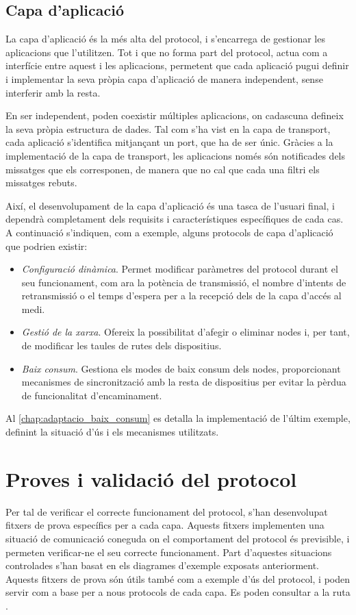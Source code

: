 \documentclass{tfgitic}[2024/07/01]
\begin{document}
{\subsection{Capa d'aplicació}
La capa d'aplicació és la més alta del protocol, i s'encarrega de gestionar les aplicacions que l'utilitzen. Tot i que no forma part del protocol, actua com a interfície entre aquest i les aplicacions, permetent que cada aplicació pugui definir i implementar la seva pròpia capa d'aplicació de manera independent, sense interferir amb la resta. 

En ser independent, poden coexistir múltiples aplicacions, on cadascuna defineix la seva pròpia estructura de dades. Tal com s'ha vist en la capa de transport, cada aplicació s'identifica mitjançant un port, que ha de ser únic. Gràcies a la implementació de la capa de transport, les aplicacions només són notificades dels missatges que els corresponen, de manera que no cal que cada una filtri els missatges rebuts.

Així, el desenvolupament de la capa d'aplicació és una tasca de l'usuari final, i dependrà completament dels requisits i característiques específiques de cada cas. A continuació s'indiquen, com a exemple, alguns protocols de capa d'aplicació que podrien existir:
\begin{itemize}
    \item \emph{Configuració dinàmica}. Permet modificar paràmetres del protocol durant el seu funcionament, com ara la potència de transmissió, el nombre d'intents de retransmissió o el temps d'espera per a la recepció dels  de la capa d'accés al medi.
    \item \emph{Gestió de la xarxa}. Ofereix la possibilitat d'afegir o eliminar nodes i, per tant, de modificar les taules de rutes dels dispositius.
    \item \emph{Baix consum}. Gestiona els modes de baix consum dels nodes, proporcionant mecanismes de sincronització amb la resta de dispositius per evitar la pèrdua de funcionalitat d'encaminament.
\end{itemize}

Al \autoref{chap:adaptacio_baix_consum} es detalla la implementació de l'últim exemple, definint la situació d'ús i els mecanismes utilitzats.

\section{Proves i validació del protocol}
Per tal de verificar el correcte funcionament del protocol, s'han desenvolupat fitxers de prova específics per a cada capa. Aquests fitxers implementen una situació de comunicació coneguda on el comportament del protocol és previsible, i permeten verificar-ne el seu correcte funcionament. Part d'aquestes situacions controlades s'han basat en els diagrames d'exemple exposats anteriorment. Aquests fitxers de prova són útils també com a exemple d'ús del protocol, i poden servir com a base per a nous protocols de cada capa. Es poden consultar a la ruta .

}
\end{document}
